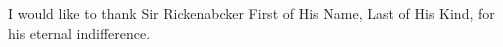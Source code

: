 \begin{acknowledgments}

I would like to thank Sir Rickenabcker First of His Name, Last of His Kind, for his eternal indifference.


\end{acknowledgments}